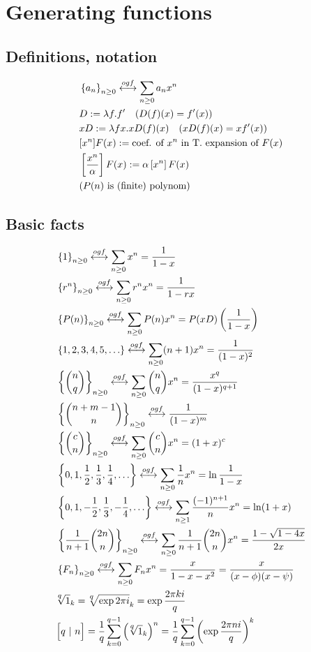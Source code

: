 \section{Generating functions}
\subsection{Definitions, notation}
\begin{align*}
&\left\lbrace a_n\right\rbrace_{n\geq 0} \overset{ogf}{\longleftrightarrow} \sum_{n \geq 0} a_n x^n\\ 
&D := \lambda f . f' ~~~ (D(f)(x) = f'(x))\\
&xD := \lambda f x . x D(f)(x) ~~~ (xD(f)(x) = xf'(x))\\
&[x^n]F(x) := \text{coef. of $x^n$ in T. expansion of $F(x)$}\\
&\left[\dfrac{x^n}{\alpha}\right]F(x) := \alpha \left[x^n\right]F(x)\\
&\text{($P(n)$ is (finite) polynom)}\\
\end{align*}

\subsection{Basic facts}
\begin{align*}
&\nseq{1} \ogf \sum_{n \geq 0} x^n = \dfrac{1}{1-x}\\
&\nseq{r^n} \ogf \sum_{n \geq 0} r^n x^n = \dfrac{1}{1-rx}\\
&\nseq{P(n)} \ogf \sum_{n \geq 0} P(n) x^n = P(xD) \left(\dfrac{1}{1-x}\right)\\
&\seq{1,2,3,4,5,\ldots} \ogf \sum_{n \geq 0} (n+1) x^n = \dfrac{1}{(1-x)^2}\\
&\nseq{{n \choose q}} \ogf \sum_{n\geq 0}{n \choose q} x^n =  \dfrac{x^q}{(1-x)^{q+1}}\\
&\nseq{{n + m - 1 \choose n}} \ogf \dfrac{1}{(1-x)^m}\\
&\nseq{{c \choose n}} \ogf \sum_{n \geq 0} {c \choose n} x^n = (1+x)^c\\
&\seq{0, 1, \dfrac{1}{2}, \dfrac{1}{3}, \dfrac{1}{4}, \ldots} \ogf \sum_{n \geq 0} \dfrac{1}{n} x^n = \ln \dfrac{1}{1-x}\\
&\seq{0, 1, -\dfrac{1}{2}, \dfrac{1}{3}, -\dfrac{1}{4}, \ldots} \ogf \sum_{n \geq 1} \dfrac{(-1)^{n+1}}{n} x^n = \ln(1+x) \\
&\nseq{\dfrac{1}{n+1} {2n \choose n}} \ogf \sum_{n \geq 0} \dfrac{1}{n+1} {2n \choose n} x^n = \dfrac{1 - \sqrt{1 - 4x}}{2x} \\
&\nseq{F_n} \ogf \sum_{n \geq 0} F_n x^n = \dfrac{x}{1 - x - x^2} = \dfrac{x}{(x - \phi)(x - \psi)}\\
& \nthroot{q}{1}_{k} = \nthroot{q}{\exp{2\pi i}}_{k} = \exp{\dfrac{2\pi ki}{q}}\\
&\Big[q ~|~ n\Big] = 
\dfrac{1}{q} \sum_{k=0}^{q-1} \left(\nthroot{q}{1}_{k}\right)^n = 
\dfrac{1}{q} \sum_{k=0}^{q-1} \left( \exp{\dfrac{2\pi n i}{q}} \right)^k  \\
\end{align*}

